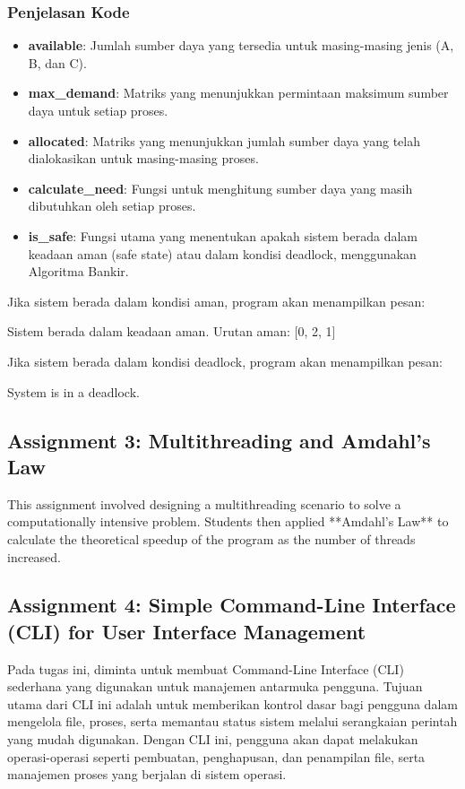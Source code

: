 \documentclass[12pt]{article}
\begin{document}
\subsubsection{Penjelasan Kode}
\begin{itemize}
    \item \textbf{available}: Jumlah sumber daya yang tersedia untuk masing-masing jenis (A, B, dan C).
    \item \textbf{max\_demand}: Matriks yang menunjukkan permintaan maksimum sumber daya untuk setiap proses.
    \item \textbf{allocated}: Matriks yang menunjukkan jumlah sumber daya yang telah dialokasikan untuk masing-masing proses.
    \item \textbf{calculate\_need}: Fungsi untuk menghitung sumber daya yang masih dibutuhkan oleh setiap proses.
    \item \textbf{is\_safe}: Fungsi utama yang menentukan apakah sistem berada dalam keadaan aman (safe state) atau dalam kondisi deadlock, menggunakan Algoritma Bankir.
\end{itemize}

Jika sistem berada dalam kondisi aman, program akan menampilkan pesan:
\begin{python}
    
Sistem berada dalam keadaan aman.
Urutan aman: [0, 2, 1]
\end{python}

Jika sistem berada dalam kondisi deadlock, program akan menampilkan pesan:
\begin{python}
    System is in a deadlock.
\end{python}


\subsection{Assignment 3: Multithreading and Amdahl's Law}
This assignment involved designing a multithreading scenario to solve a computationally intensive problem. Students then applied **Amdahl's Law** to calculate the theoretical speedup of the program as the number of threads increased.

\subsection{Assignment 4: Simple Command-Line Interface (CLI) for User Interface Management}
Pada tugas ini, diminta untuk membuat Command-Line Interface (CLI) sederhana yang digunakan untuk manajemen antarmuka pengguna. Tujuan utama dari CLI ini adalah untuk memberikan kontrol dasar bagi pengguna dalam mengelola file, proses, serta memantau status sistem melalui serangkaian perintah yang mudah digunakan. Dengan CLI ini, pengguna akan dapat melakukan operasi-operasi seperti pembuatan, penghapusan, dan penampilan file, serta manajemen proses yang berjalan di sistem operasi.
\end{document}
